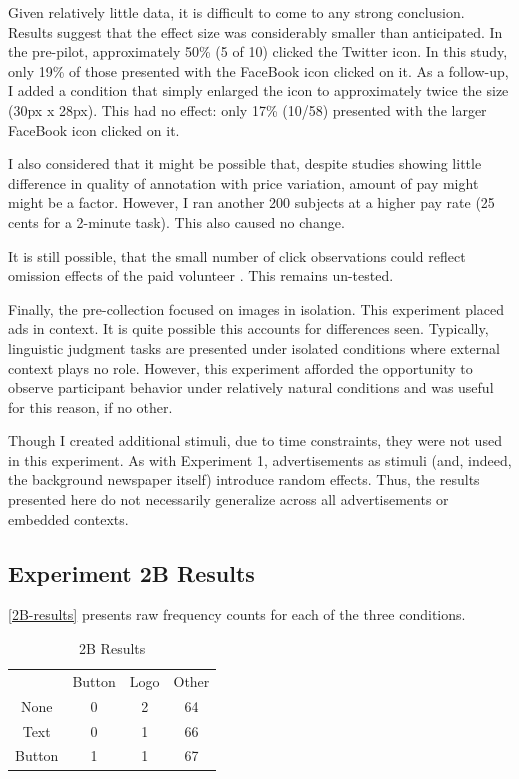 Given relatively little data, it is difficult to come to any strong conclusion. Results suggest that the effect size was considerably smaller than anticipated. In the pre-pilot, approximately 50\% (5 of 10) clicked the Twitter icon. In this study, only 19\% of those presented with the FaceBook icon clicked on it. As a follow-up, I added a condition that simply enlarged the icon to approximately twice the size (30px x 28px). This had no effect: only 17\% (10\slash 58) presented with the larger FaceBook icon clicked on it.

I also considered that it might be possible that, despite studies showing little difference in quality of annotation with price variation, amount of pay might might be a factor. However, I ran another 200 subjects at a higher pay rate (25 cents for a 2-minute task). This also caused no change.

It is still possible, that the small number of click observations could reflect omission effects of the paid volunteer  \citep{Rush:1978tw}.  This remains un-tested.

Finally, the pre-collection focused on images in isolation.   This experiment placed ads in context. It is quite possible this accounts for differences seen. Typically, linguistic judgment tasks are presented under isolated conditions where external context plays no role. However, this experiment afforded the opportunity to observe participant behavior under relatively natural conditions and was useful for this reason, if no other.

Though I created additional stimuli, due to time constraints, they were not used in this experiment. As with Experiment 1, advertisements as stimuli (and, indeed, the background newspaper itself) introduce random effects. Thus, the results presented here do not necessarily generalize across all advertisements or embedded contexts. 

\subsection{Experiment 2B Results}
\label{experiment2bresults}

 \autoref{2B-results}  presents raw frequency counts for each of the three conditions. 


\begin{table}
\caption{2B Results}
\label{2B-results}
\centering
\begin{tabular}{cccc}
 & Button & Logo & Other\tabularnewline
\cline{2-4} 
None & 0 & 2 & 64\tabularnewline
Text & 0 & 1 & 66\tabularnewline
Button & 1 & 1 & 67\tabularnewline
\end{tabular}
\end{table}


